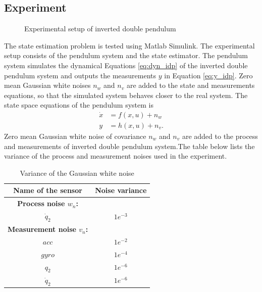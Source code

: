 \subsection{Experiment}
\begin{figure}[h]
    \centering
    
    \caption{Experimental setup of inverted double pendulum}
    \label{fig:exp_idp}  
\end{figure}

The state estimation problem is tested using Matlab Simulink. The experimental setup consists of the pendulum system and the state estimator. The pendulum system simulates the dynamical Equations \ref{eq:dyn_idp} of the inverted double pendulum system and outputs the measurements $y$ in Equation \ref{eq:y_idp}. Zero mean Gaussian white noises $n_w$ and $n_v$ are added to the state and measurements equations, so that the simulated system behaves closer to the real system. The state space equations of the pendulum system is 
\begin{equation}
    \label{eq:sim_idp}
    \begin{split}
    \dot x &= f(x,u) + n_w \\
    y &= h(x,u) + n_v.
    \end{split}
\end{equation}
Zero mean Gaussian white noise of covariance $n_w$ and $n_v$ are added to the process and measurements of inverted double pendulum system.The table below lists the variance of the process and measurement noises used in the experiment.
\begin{table}[H]
    \centering
    \begin{tabular}{|c|c|}
    \hline
    Name of the sensor &Noise variance\\ \hline
    \textbf{Process noise $w_n$:}&\hspace{2mm} \\
    $\dot q_2$ &$1e^{-3}$ \\ \hline
    \textbf{Measurement noise $v_n$:}&\hspace{2mm} \\
     $acc$ &$1e^{-2}$ \\
     $gyro$ &$1e^{-4}$ \\
     $q_2$ &$1e^{-6}$\\ 
     $\dot q_2$ &$1e^{-6}$ \\ \hline
    \end{tabular}
    \caption{ Variance of the Gaussian white noise}
    \label{tab:idp_noise}
\end{table}

